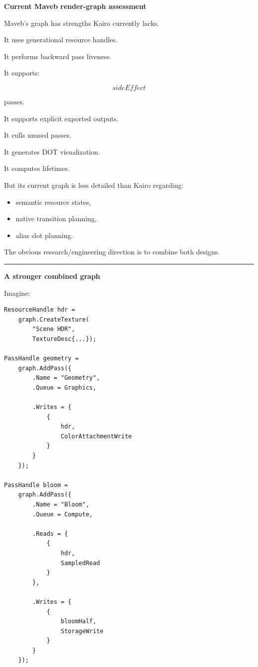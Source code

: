 \textbf{Current Maveb render-graph assessment}

Maveb's graph has strengths Kairo currently lacks.

It uses generational resource handles.

It performs backward pass liveness.

It supports:

\[
sideEffect
\]

passes.

It supports explicit exported outputs.

It culls unused passes.

It generates DOT visualization.

It computes lifetimes.

But its current graph is less detailed than Kairo regarding:

\begin{itemize}
\tightlist
\item
  semantic resource states,
\item
  native transition planning,
\item
  alias slot planning.
\end{itemize}

The obvious research/engineering direction is to combine both designs.

\begin{center}\rule{0.5\linewidth}{0.5pt}\end{center}

\textbf{A stronger combined graph}

Imagine:

\begin{verbatim}
ResourceHandle hdr =
    graph.CreateTexture(
        "Scene HDR",
        TextureDesc{...});

PassHandle geometry =
    graph.AddPass({
        .Name = "Geometry",
        .Queue = Graphics,

        .Writes = {
            {
                hdr,
                ColorAttachmentWrite
            }
        }
    });

PassHandle bloom =
    graph.AddPass({
        .Name = "Bloom",
        .Queue = Compute,

        .Reads = {
            {
                hdr,
                SampledRead
            }
        },

        .Writes = {
            {
                bloomHalf,
                StorageWrite
            }
        }
    });
\end{verbatim}

